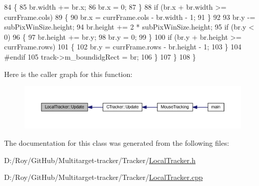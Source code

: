 \begin{DoxyCode}
84             \{
85                 br.width += br.x;
86                 br.x = 0;
87             \}
88             \textcolor{keywordflow}{if} (br.x + br.width >= currFrame.cols)
89             \{
90                 br.x = currFrame.cols - br.width - 1;
91             \}
92 
93             br.y -= subPixWinSize.height;
94             br.height += 2 * subPixWinSize.height;
95             \textcolor{keywordflow}{if} (br.y < 0)
96             \{
97                 br.height += br.y;
98                 br.y = 0;
99             \}
100             \textcolor{keywordflow}{if} (br.y + br.height >= currFrame.rows)
101             \{
102                 br.y = currFrame.rows - br.height - 1;
103             \}
104 \textcolor{preprocessor}{#endif}
105             track->m\_boundidgRect = br;
106         \}
107     \}
108 \}
\end{DoxyCode}
Here is the caller graph for this function\+:\nopagebreak
\begin{figure}[H]
\begin{center}
\leavevmode
\includegraphics[width=350pt]{class_local_tracker_a7fad09ebaf507de2a400ec17ec96fa56_icgraph}
\end{center}
\end{figure}


The documentation for this class was generated from the following files\+:\begin{DoxyCompactItemize}
\item 
D\+:/\+Roy/\+Git\+Hub/\+Multitarget-\/tracker/\+Tracker/\mbox{\hyperlink{_local_tracker_8h}{Local\+Tracker.\+h}}\item 
D\+:/\+Roy/\+Git\+Hub/\+Multitarget-\/tracker/\+Tracker/\mbox{\hyperlink{_local_tracker_8cpp}{Local\+Tracker.\+cpp}}\end{DoxyCompactItemize}
